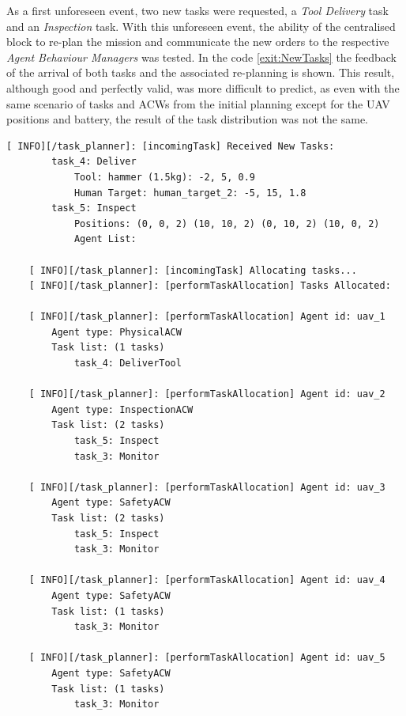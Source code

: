 As a first unforeseen event, two new tasks were requested, a \emph{Tool Delivery} task and an \emph{Inspection} task. With this unforeseen event, the ability of the centralised block to re-plan the mission and communicate the new orders to the respective \emph{Agent Behaviour Managers} was tested. In the code \ref{exit:NewTasks} the feedback of the arrival of both tasks and the associated re-planning is shown. This result, although good and perfectly valid, was more difficult to predict, as even with the same scenario of tasks and \glspl{ACW} from the initial planning except for the \gls{UAV} positions and battery, the result of the task distribution was not the same.

\begin{lstlisting}[caption={Feedback messages printed after the arrival of new tasks}, breaklines=true, label=exit:NewTasks]
    [ INFO][/task_planner]: [incomingTask] Received New Tasks:
        task_4: Deliver
            Tool: hammer (1.5kg): -2, 5, 0.9
            Human Target: human_target_2: -5, 15, 1.8
        task_5: Inspect
            Positions: (0, 0, 2) (10, 10, 2) (0, 10, 2) (10, 0, 2)
            Agent List:

    [ INFO][/task_planner]: [incomingTask] Allocating tasks...
    [ INFO][/task_planner]: [performTaskAllocation] Tasks Allocated:

    [ INFO][/task_planner]: [performTaskAllocation] Agent id: uav_1
        Agent type: PhysicalACW
        Task list: (1 tasks)
            task_4: DeliverTool

    [ INFO][/task_planner]: [performTaskAllocation] Agent id: uav_2
        Agent type: InspectionACW
        Task list: (2 tasks)
            task_5: Inspect
            task_3: Monitor

    [ INFO][/task_planner]: [performTaskAllocation] Agent id: uav_3
        Agent type: SafetyACW
        Task list: (2 tasks)
            task_5: Inspect
            task_3: Monitor

    [ INFO][/task_planner]: [performTaskAllocation] Agent id: uav_4
        Agent type: SafetyACW
        Task list: (1 tasks)
            task_3: Monitor

    [ INFO][/task_planner]: [performTaskAllocation] Agent id: uav_5
        Agent type: SafetyACW
        Task list: (1 tasks)
            task_3: Monitor
\end{lstlisting}

